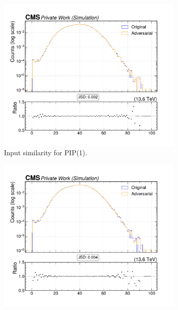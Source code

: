 \begin{figure}[htbp]
  \centering
  \begin{subfigure}[t]{0.32\textwidth}
    \includegraphics[width=\linewidth]{media/output/features/compare/intprob_1/cmp_global_features_npv.pdf}
    \caption{Input similarity for PIP(1).}
  \end{subfigure}\hfill
  \begin{subfigure}[t]{0.32\textwidth}
    \includegraphics[width=\linewidth]{media/output/features/compare/intprob_2/cmp_global_features_npv.pdf}

\end{subfigure}
\end{figure}
